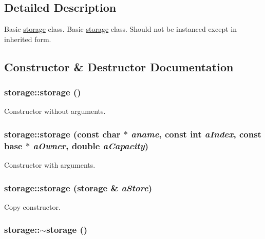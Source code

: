 \subsection{Detailed Description}
Basic \hyperlink{classstorage}{storage} class. Basic \hyperlink{classstorage}{storage} class. Should not be instanced except in inherited form. 

\subsection{Constructor \& Destructor Documentation}
\hypertarget{classstorage_a55f5297949ab4ab66c09563e1d3875ec}{
\subsubsection[{storage}]{\setlength{\rightskip}{0pt plus 5cm}storage::storage ()}}
\label{classstorage_a55f5297949ab4ab66c09563e1d3875ec}


Constructor without arguments. \hypertarget{classstorage_a6d6ff9d76ac1bb57c7977c56d5e8b61f}{
\subsubsection[{storage}]{\setlength{\rightskip}{0pt plus 5cm}storage::storage (const char $\ast$ {\em aname}, \/  const int {\em aIndex}, \/  const {\bf base} $\ast$ {\em aOwner}, \/  double {\em aCapacity})}}
\label{classstorage_a6d6ff9d76ac1bb57c7977c56d5e8b61f}


Constructor with arguments. \hypertarget{classstorage_adeb4f7de2055ed2a3384d6440df43c49}{
\subsubsection[{storage}]{\setlength{\rightskip}{0pt plus 5cm}storage::storage ({\bf storage} \& {\em aStore})}}
\label{classstorage_adeb4f7de2055ed2a3384d6440df43c49}


Copy constructor. \hypertarget{classstorage_ac7d5664e97625603e30f649d45231b06}{
\subsubsection[{$\sim$storage}]{\setlength{\rightskip}{0pt plus 5cm}storage::$\sim$storage ()}}
\label{classstorage_ac7d5664e97625603e30f649d45231b06}


